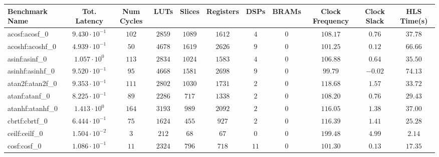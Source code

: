 \begin{tabular}{|l|c|c|c|c|c|c|c|c|c|c|}
\hline
Benchmark Name               & Tot. Latency            & Num Cycles & LUTs      & Slices    & Registers & DSPs    & BRAMs & Clock Frequency & Clock Slack & HLS Time(s) \\
\hline
acosf:acosf\_0               & $ 9.430 \cdot 10^{-1} $ & $ 102    $ & $ 2859  $ & $ 1089  $ & $ 1612  $ & $ 4   $ & $ 0 $ & $ 108.17      $ & $ 0.76    $ & $ 37.78   $ \\
acoshf:acoshf\_0             & $ 4.939 \cdot 10^{-1} $ & $ 50     $ & $ 4678  $ & $ 1619  $ & $ 2626  $ & $ 9   $ & $ 0 $ & $ 101.25      $ & $ 0.12    $ & $ 66.66   $ \\
asinf:asinf\_0               & $ 1.057 \cdot 10^{0}  $ & $ 113    $ & $ 2834  $ & $ 1024  $ & $ 1583  $ & $ 4   $ & $ 0 $ & $ 106.88      $ & $ 0.64    $ & $ 35.50   $ \\
asinhf:asinhf\_0             & $ 9.520 \cdot 10^{-1} $ & $ 95     $ & $ 4668  $ & $ 1581  $ & $ 2698  $ & $ 9   $ & $ 0 $ & $ 99.79       $ & $ -0.02   $ & $ 74.13   $ \\
atan2f:atan2f\_0             & $ 9.353 \cdot 10^{-1} $ & $ 111    $ & $ 2802  $ & $ 1030  $ & $ 1731  $ & $ 2   $ & $ 0 $ & $ 118.68      $ & $ 1.57    $ & $ 33.72   $ \\
atanf:atanf\_0               & $ 8.225 \cdot 10^{-1} $ & $ 89     $ & $ 2286  $ & $ 717   $ & $ 1338  $ & $ 2   $ & $ 0 $ & $ 108.20      $ & $ 0.76    $ & $ 29.43   $ \\
atanhf:atanhf\_0             & $ 1.413 \cdot 10^{0}  $ & $ 164    $ & $ 3193  $ & $ 989   $ & $ 2092  $ & $ 2   $ & $ 0 $ & $ 116.05      $ & $ 1.38    $ & $ 37.00   $ \\
cbrtf:cbrtf\_0               & $ 6.444 \cdot 10^{-1} $ & $ 75     $ & $ 1624  $ & $ 455   $ & $ 927   $ & $ 2   $ & $ 0 $ & $ 116.39      $ & $ 1.41    $ & $ 25.28   $ \\
ceilf:ceilf\_0               & $ 1.504 \cdot 10^{-2} $ & $ 3      $ & $ 212   $ & $ 68    $ & $ 67    $ & $ 0   $ & $ 0 $ & $ 199.48      $ & $ 4.99    $ & $ 2.14    $ \\
cosf:cosf\_0                 & $ 1.086 \cdot 10^{-1} $ & $ 11     $ & $ 2324  $ & $ 796   $ & $ 718   $ & $ 11  $ & $ 0 $ & $ 101.30      $ & $ 0.13    $ & $ 17.35   $ \\

\end{tabular}
